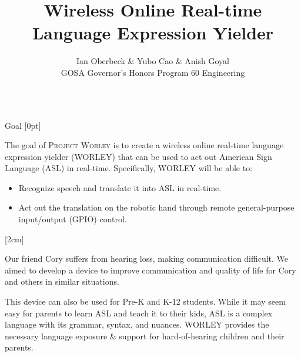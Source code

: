 \documentclass[final, 20pt]{beamer}
\title{Wireless Online Real-time Language Expression Yielder}
\author{Ian Oberbeck \& Yubo Cao \& Anish Goyal \\\normalfont\selectfont GOSA Governor's Honors Program 60 Engineering}
\newlength{\colwidth}
\begin{document}
\begin{frame}[t]
  \centering
  \begin{columns}[t]
    \margincolumn

    \begin{column}{\colwidth}
      \begin{block}{Goal}
        [0pt]

        The goal of \textsc{Project Worley} is to create a wireless online real-time language expression yielder (WORLEY) that can be used to act out American Sign Language (ASL) in real-time. Specifically, WORLEY will be able to:

        \begin{itemize}
          \item Recognize speech and translate it into ASL in real-time.
          \item Act out the translation on the robotic hand through remote general-purpose input/output (GPIO) control.
        \end{itemize}

        [2cm]

        Our friend Cory suffers from hearing loss, making communication difficult. We aimed to develop a device to improve communication and quality of life for Cory and others in similar situations.

        This device can also be used for Pre-K and K-12 students.  While it may seem easy for parents to learn ASL and teach it to their kids, ASL is a complex language with its grammar, syntax, and nuances. WORLEY provides the necessary language exposure \& support for hard-of-hearing children and their parents.
      \end{block}


\end{column}
\end{columns}
\end{frame}
\end{document}
